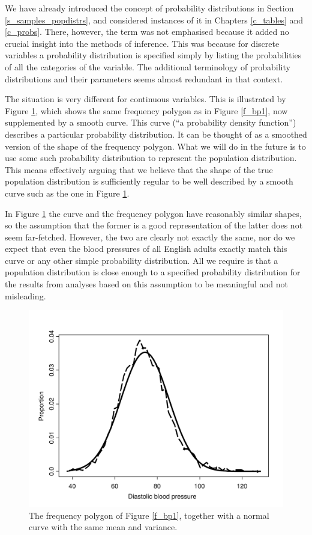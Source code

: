 We have already introduced the concept of probability distributions in
Section \ref{s_samples_popdistrs},  and considered instances of it in
Chapters \ref{c_tables} and \ref{c_probs}. There, however, the term was
not emphasised because it added no crucial insight into the
methods of inference. This was because for discrete variables a
probability distribution is specified simply by listing the
probabilities of all the categories of the variable. The additional
terminology of probability distributions and their parameters seems
almost redundant in that context.

The situation is very different for continuous variables. This is
illustrated by Figure \ref{f_bp2}, which shows the same frequency
polygon as in Figure \ref{f_bp1}, now supplemented by a
smooth curve. This curve (``a probability density
function'') describes a particular probability distribution. It can be
thought of as a smoothed version of the shape of the frequency polygon.
What we will do in the future is to use some such probability
distribution to represent the population distribution. This means
effectively arguing that we believe that the shape of the true
population distribution is sufficiently regular to be well described by
a smooth curve such as the one in Figure \ref{f_bp2}.

In Figure \ref{f_bp2} the curve and the frequency polygon have
reasonably similar shapes, so the assumption that the former is a
good representation of the latter does not seem far-fetched. However, the two are
clearly not exactly the same, \label{p_model2} nor do we expect that
even the blood pressures of all English adults exactly match
this curve or any other
simple probability distribution. All we require is that a
population distribution is close enough to a specified probability
distribution for the results from analyses based on this assumption to
be meaningful and not misleading.


\begin{figure}
\caption{The frequency polygon of Figure \ref{f_bp1},
together with a normal curve with the same mean and variance.}
\label{f_bp2}
\begin{center}
\vspace*{-4ex}
\includegraphics[width=11.5cm]{bloodp2}
\end{center}
\vspace*{-3ex}
\end{figure}

